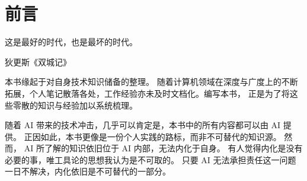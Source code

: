 \chapter*{前言}

\epigraph{这是最好的时代，也是最坏的时代。}{\textemdash\textemdash 狄更斯《双城记》}

本书缘起于对自身技术知识储备的整理。
随着计算机领域在深度与广度上的不断拓展，个人笔记散落各处，工作经验亦未及时文档化。编写本书，
正是为了将这些零散的知识与经验加以系统梳理。

随着 AI 带来的技术冲击，几乎可以肯定是，本书中的所有内容都可以由 AI 提供。
正因如此，本书更像是一份个人实践的路标，而非不可替代的知识源。
然而， AI 所了解的知识依旧位于 AI 内部，无法内化于自身。
有人觉得内化是没有必要的事，唯工具论的思想我认为是不可取的。
只要 AI 无法承担责任这一问题一日不解决，内化依旧是不可替代的一部分。

\newpage